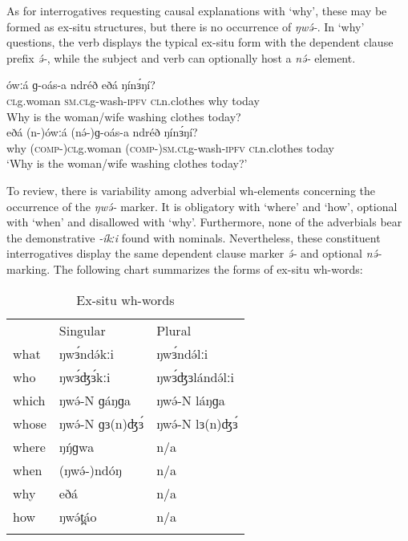 As for interrogatives requesting causal explanations with ‘why’, these may be formed as ex-situ structures, but there is no occurrence of \textit{ŋwə́-}. In ‘why’ questions, the verb displays the typical ex-situ form with the dependent clause prefix \textit{ə́-}, while the subject and verb can optionally host a \textit{nə́-} element.

\ea
\ea \gll	ówːá	ɡ-oás-a	ndréð	eðá	ŋínɜ́ŋí?\\
	\textsc{cl}g.woman	\textsc{sm.cl}g-wash-\textsc{ipfv}	\textsc{cl}n.clothes	why	today\\
\trans		Why is the woman/wife washing clothes today?\\
\ex \gll	eðá	(n-)ówːá	(nə́-)ɡ-oás-a	ndréð	ŋínɜ́ŋí?\\
	why	(\textsc{comp-})\textsc{cl}g.woman	(\textsc{comp-})\textsc{sm.cl}g-wash-\textsc{ipfv}	\textsc{cl}n.clothes	today\\
\trans		‘Why is the woman/wife washing clothes today?’\\
\z
\z

To review, there is variability among adverbial wh-elements concerning the occurrence of the \textit{ŋwə́-} marker. It is obligatory with ‘where’ and ‘how’, optional with ‘when’ and disallowed with ‘why’. Furthermore, none of the adverbials bear the demonstrative \textit{-íkːi} found with nominals. Nevertheless, these constituent interrogatives display the same dependent clause marker \textit{ə́-} and optional \textit{nə́-} marking. The following chart summarizes the forms of ex-situ wh-words: 

\begin{table}
	\caption{Ex-situ wh-words}
	\label{Ch19:2}
	\begin{tabular}[t]{lll}
	\lsptoprule
&	Singular	&	Plural\\
what	&	ŋwɜ́ndə́kːi	&	ŋwɜ́ndə́lːi\\
who	&	ŋwɜ́ʤɜ́kːi	&	ŋwɜ́ʤɜlándə́lːi\\
which	&	ŋwə́-N  ɡáŋɡa	&	ŋwə́-N láŋɡa\\
whose	&	ŋwə́-N  ɡɜ(n)ʤɜ́	&	ŋwə́-N lɜ(n)ʤɜ́\\
where	&	ŋŋ́ɡwa	&	n/a\\
when	&	(ŋwə́-)ndóŋ	&	n/a\\
why	&	eðá	&	n/a\\
how	&	ŋwə́t̪áo	&	n/a\\
	\lspbottomrule
	\end{tabular}
\end{table}

